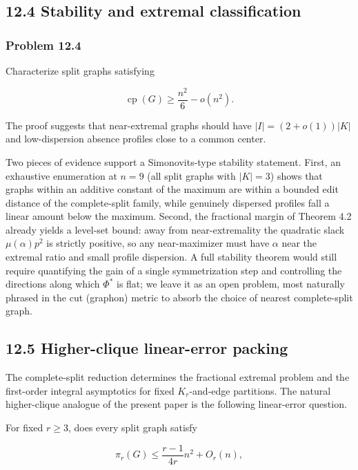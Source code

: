 \documentclass[
  11pt,
]{article}
\begin{document}
\subsection{12.4 Stability and extremal classification}\label{stability-and-extremal-classification}

\subsubsection{Problem 12.4}\label{problem-12.4}

Characterize split graphs satisfying

\[
\operatorname{cp}(G)
\ge
\frac{n^2}{6}-o(n^2).
\]

The proof suggests that near-extremal graphs should have \(|I|=(2+o(1))|K|\) and low-dispersion absence profiles close to a common center.

Two pieces of evidence support a Simonovits-type stability statement. First, an exhaustive
enumeration at \(n=9\) (all split graphs with \(|K|=3\)) shows that graphs within an additive
constant of the maximum are within a bounded edit distance of the complete-split family, while
genuinely dispersed profiles fall a linear amount below the maximum. Second, the fractional
margin of Theorem 4.2 already yields a level-set bound: away from near-extremality the
quadratic slack \(\mu(\alpha)p^2\) is strictly positive, so any near-maximizer must have
\(\alpha\) near the extremal ratio and small profile dispersion. A full stability theorem
would still require quantifying the gain of a single symmetrization step and controlling the
directions along which \(\Phi^*\) is flat; we leave it as an open problem, most naturally
phrased in the cut (graphon) metric to absorb the choice of nearest complete-split graph.

\subsection{12.5 Higher-clique linear-error packing}\label{higher-clique-linear-error-packing}

The complete-split reduction determines the fractional extremal problem and the first-order integral asymptotics for fixed \(K_r\)-and-edge partitions. The natural higher-clique analogue of the present paper is the following linear-error question.

For fixed \(r\ge3\), does every split graph satisfy

\[
\pi_r(G)
\le
\frac{r-1}{4r}n^2+O_r(n),
\]
\end{document}
